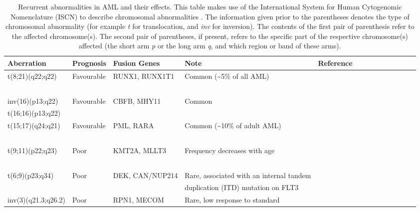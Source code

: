 \begin{landscape}
	\pagestyle{empty} %
\begin{table}[h]

    \centering
    \caption{Recurrent abnormalities in AML and their effects. This table makes use of the International System for Human Cytogenomic Nomenclature (ISCN) to describe chromosomal abnormalities \citep{ISCN}. The information given prior to the parentheses denotes the type of chromosomal abnormality (for example \textit{t} for translocation, and \textit{inv} for inversion). The contents of the first pair of parenthesis refer to the affected chromosome(s). The second pair of parentheses, if present, refers to the specific part of the respective chromosome(s) affected (the short arm \textit{p} or the long arm \textit{q}, and which region or band of these arms).}
    \label{tab:karyotype}
    \begin{tabular}{lllllllllllll}
    \toprule
        \textbf{Aberration} & \textbf{Prognosis} & \textbf{Fusion Genes} & \textbf{Note} & \textbf{Reference}  & ~ \\ \midrule
        t(8;21)(q22;q22) & Favourable & RUNX1, RUNX1T1 & Common (\textasciitilde 5\% of all AML) & \cite{reikvam2011acute}  & ~ \\ 
        ~ & ~ & ~ & ~ & \cite{peterson20048}  & ~ \\ \hline
        inv(16)(p13;q22) & Favourable & CBFB, MHY11 & Common & \cite{plantier1994inv}  & ~ \\ 
        t(16;16)(p13;q22) & ~ & ~ & ~ & \cite{shigesada2004mechanism}  & ~ \\ \hline
        t(15;17)(q24;q21) & Favourable & PML, RARA  & Common (\textasciitilde 10\% of adult AML) & \cite{de2014rara}  & ~ \\ 
        ~ & ~ & ~ & ~ &   & ~ \\ \hline
        t(9;11)(p22;q23) & Poor & KMT2A, MLLT3 & Frequency decreases with age & \cite{chandra2010acute}  & ~ \\ 
        ~ & ~ & ~ & ~ & \cite{metzler2004emergence}  & ~ \\ \hline
        t(6;9)(p23;q34) & Poor & DEK, CAN/NUP214 & Rare, associated with an internal tandem & \cite{chi2008acute}  & ~ \\ 
        ~ & ~ & ~ &  duplication (ITD) mutation on FLT3 &   & ~ \\ \hline
        inv(3)(q21.3;q26.2) & Poor & RPN1, MECOM & Rare, low response to standard  & \cite{sitges2020acute} & ~ \\ 

\end{tabular}
\end{table}
\end{landscape}
